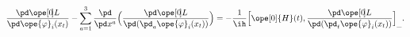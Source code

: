 \begin{equation}	\label{12.81new1}
\frac{\pd\ope[0\mspace{-3mu}]{L}}{\pd \ope{\varphi}_i(x_t)}
-
\sum_{a=1}^{3}\frac{\pd}{\pd x^a}\Bigl(
	\frac{\pd\ope[0\mspace{-3mu}]{L}}{\pd(\pd_a\ope{\varphi}_i(x_t) )}
	 \Bigr)
 =
- \frac{1}{\ih}
\Bigl[
	\ope[0]{H}(t) ,
	\frac{\pd\ope[0\mspace{-3mu}]{L}}{\pd(\pd_t\ope{\varphi}_i(x_t) )}
\Bigr]_{\_} .
	\end{equation}

